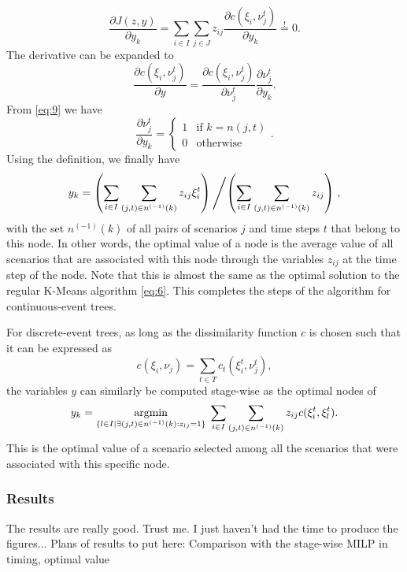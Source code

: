 \begin{equation}
  \label{eq:12}
  \frac{\partial J(z,y)}{\partial y_k} = \sum_{i\in I}\sum_{j\in J}z_{ij}\frac{\partial c(\xi_i, \nu_j^t)}{\partial y_k}\overset{!}{=} 0.
\end{equation}
The derivative can be expanded to
\begin{equation}
  \label{eq:13}
  \frac{\partial c(\xi_i, \nu_j^t)}{\partial y} = \frac{\partial c(\xi_i, \nu_j^t)}{\partial \nu_j^t}\frac{\partial \nu_j^t}{\partial y_k}.
\end{equation}
From \eqref{eq:9} we have
\begin{equation}
  \label{eq:14}
  \frac{\partial \nu_j^t}{\partial y_k} = 
  \left\{
    \begin{array}{ll}
      1&\text{if } k = n(j,t)\\0&\text{otherwise}
    \end{array}
  \right. .
\end{equation}
Using the definition, we finally have 
\begin{align}
  \label{eq:15}
  y_k = \left(\sum_{i\in I}\sum_{(j,t)\in n^{(-1)}(k)}z_{ij}\xi_i^t \right) \left / \left(\sum_{i\in I}\sum_{(j,t)\in n^{(-1)}(k)}z_{ij}\right)\right. ,
\end{align}
with the set $n^{(-1)}(k)$ of all pairs of scenarios $j$ and time steps $t$ that belong to this node.
In other words, the optimal value of a node is the average value of all scenarios that are associated with this node through the variables $z_{ij}$ at the time step of the node.
Note that this is almost the same as the optimal solution to the regular K-Means algorithm \eqref{eq:6}.
This completes the steps of the algorithm for continuous-event trees.

For discrete-event trees, as long as the dissimilarity function $c$ is chosen such that it can be expressed as 
\begin{equation}
  \label{eq:16}
  c(\xi_i, \nu_j) = \sum_{t\in T}c_t(\xi_i^t,\nu_j^t),
\end{equation}
the variables $y$ can similarly be computed stage-wise as the optimal nodes of 
\begin{equation}
  \label{eq:17}
  y_k = \underset{\{l\in I|\exists (j,t)\in n^{(-1)}(k):z_{lj}=1\} }{\operatorname{argmin}}\; \sum_{i\in I}\sum_{(j,t)\in n^{(-1)}(k)}z_{ij}c(\xi_i^t, \xi_l^t).
\end{equation}
This is the optimal value of a scenario selected among all the scenarios that were associated with this specific node.
\subsubsection{Results}
\label{sec:kmeans-results}
The results are really good.
Trust me.
I just haven't had the time to produce the figures...
Plans of results to put here: Comparison with the stage-wise MILP in timing, optimal value
